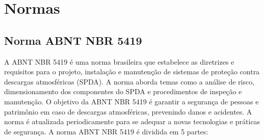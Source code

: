 \documentclass[a4paper, 12pt, onecolumn,singlespacing]{article}
\begin{document}
	\section{Normas}
		
		\subsection{Norma ABNT NBR 5419}
		
		A ABNT NBR 5419 é uma norma brasileira que estabelece as diretrizes e requisitos para o projeto, instalação e manutenção de sistemas de proteção contra descargas atmosféricas (SPDA). A norma aborda temas como a análise de risco, dimensionamento dos componentes do SPDA e procedimentos de inspeção e manutenção. O objetivo da ABNT NBR 5419 é garantir a segurança de pessoas e patrimônio em caso de descargas atmosféricas, prevenindo danos e acidentes. A norma é atualizada periodicamente para se adequar a novas tecnologias e práticas de segurança.
		A norma ABNT NBR 5419 é dividida em 5 partes:
		
\end{document}
